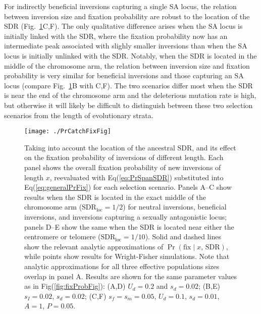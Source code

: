 \documentclass{article}
\begin{document}
For indirectly beneficial inversions capturing a single SA locus, the relation between inversion size and fixation probability are robust to the location of the SDR (Fig.~\ref{fig:probCatchFixFig}C,F). The only qualitative difference arises when the SA locus is initially linked with the SDR, where the fixation probability now has an intermediate peak associated with slighly smaller inversions than when the SA locus is initially unlinked with the SDR. Notably, when the SDR is located in the middle of the chromosome arm, the relation between inversion size and fixation probability is very similar for beneficial inversions and those capturing an SA locus (compare Fig.~\ref{fig:probCatchFixFig}B with C,F). The two scenarios differ most when the SDR is near the end of the chromosome arm and the deleterious mutation rate is high, but otherwise it will likely be difficult to distinguish between these two selection scenarios from the length of evolutionary strata.  \vspace{12pt}




 \begin{figure}[htbp]
 \centering
 \texttt{[image: ./PrCatchFixFig]}
 \caption{Taking into account the location of the ancestral SDR, and its effect on the fixation probability of inversions of different length. Each panel shows the overall fixation probability of new inversions of length $x$, reevaluated with Eq(\ref{eq:PrSpanSDR}) substituted into Eq(\ref{eq:generalPrFix}) for each selection scenario. Panels A--C show results when the SDR is located in the exact middle of the chromosome arm ($\text{SDR}_\text{loc} = 1/2$) for neutral inversions, beneficial inversions, and inversions capturing a sexually antagonistic locus; panels D--E show the same when the SDR is located near either the centromere or telomere ($\text{SDR}_\text{loc} = 1/10$). Solid and dashed lines show the relevant analytic approximations of $\Pr(\text{fix} \mid x,\, \text{SDR})$, while points show results for Wright-Fisher simulations. Note that analytic approximations for all three effective populations sizes overlap in panel A. Results are shown for the same parameter values as in Fig(\ref{fig:fixProbFig}): (A,D) $U_d = 0.2$ and $s_d = 0.02$; (B,E) $s_I = 0.02$, $s_d = 0.02$; (C,F) $s_f = s_m = 0.05$, $U_d = 0.1$, $s_d = 0.01$, $A = 1$, $P = 0.05$.}
 \label{fig:probCatchFixFig}
 \end{figure}
\end{document}
